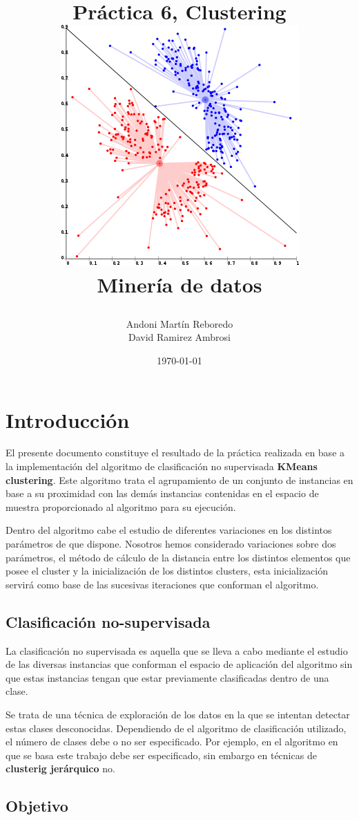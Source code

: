 \documentclass[a4paper]{report}
\author{Andoni Martín Reboredo \\ David Ramirez Ambrosi}
\title{\begin{center}
\textbf{\Huge{Práctica 6, Clustering}} \\ \includegraphics{./Figuras/KMeans-density-data.png}\\  \textbf{Minería de datos}
\end{center}}
\date{\today}
\begin{document}
\maketitle

\thispagestyle{empty}%
\newpage
\tableofcontents%
\thispagestyle{empty}
\newpage

\listoffigures%
\thispagestyle{empty}
\newpage

\setcounter{page}{1}%


\chapter{Introducción}

El presente documento constituye el resultado de la práctica realizada en base a la implementación del algoritmo de clasificación no supervisada \textbf{KMeans clustering}. Este algoritmo trata el agrupamiento de un conjunto de instancias en base a su proximidad con las demás instancias contenidas en el espacio de muestra proporcionado al algoritmo para su ejecución.

Dentro del algoritmo cabe el estudio de diferentes variaciones en los distintos parámetros de que dispone. Nosotros hemos considerado variaciones sobre dos parámetros, el método de cálculo de la distancia entre los distintos elementos que posee el cluster y la inicialización de los distintos clusters, esta inicialización servirá como base de las sucesivas iteraciones que conforman el algoritmo.

	\section{Clasificación no-supervisada}
	La clasificación no supervisada es aquella que se lleva a cabo mediante el estudio de las diversas instancias que conforman el espacio de aplicación del algoritmo sin que estas instancias tengan que estar previamente clasificadas dentro de una clase.
	
	Se trata de una técnica de exploración de los datos en la que se intentan detectar estas clases desconocidas. Dependiendo de el algoritmo de clasificación utilizado, el número de clases debe o no ser especificado. Por ejemplo, en el algoritmo en que se basa este trabajo debe ser especificado, sin embargo en técnicas de \textbf{clusterig jerárquico} no.
	
	\section{Objetivo}
	
\end{document}
